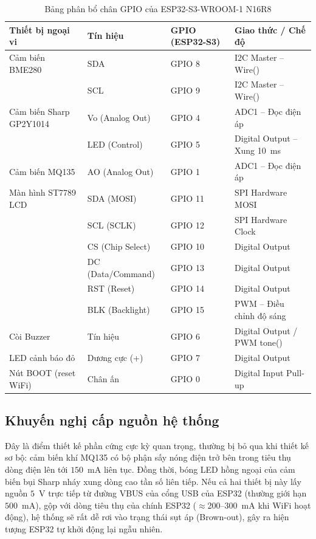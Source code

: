 \documentclass[12pt,a4paper]{article}
\begin{document}
\begin{table}[H]
  \centering
  \caption{Bảng phân bổ chân GPIO của ESP32-S3-WROOM-1 N16R8}
  \label{tab:pinout}
  \small
  \begin{tabular}{p{3.5cm} p{3.5cm} p{3cm} p{4cm}}
    \toprule
    \textbf{Thiết bị ngoại vi} & \textbf{Tín hiệu} & \textbf{GPIO (ESP32-S3)} & \textbf{Giao thức / Chế độ} \\
    \midrule
    Cảm biến BME280 & SDA & GPIO 8 & I2C Master -- Wire() \\
                    & SCL & GPIO 9 & I2C Master -- Wire() \\
    \midrule
    Cảm biến Sharp GP2Y1014 & Vo (Analog Out) & GPIO 4 & ADC1 -- Đọc điện áp \\
                             & LED (Control) & GPIO 5 & Digital Output -- Xung 10~ms \\
    \midrule
    Cảm biến MQ135 & AO (Analog Out) & GPIO 1 & ADC1 -- Đọc điện áp \\
    \midrule
    Màn hình ST7789 LCD & SDA (MOSI) & GPIO 11 & SPI Hardware MOSI \\
                        & SCL (SCLK) & GPIO 12 & SPI Hardware Clock \\
                        & CS (Chip Select) & GPIO 10 & Digital Output \\
                        & DC (Data/Command) & GPIO 13 & Digital Output \\
                        & RST (Reset) & GPIO 14 & Digital Output \\
                        & BLK (Backlight) & GPIO 15 & PWM -- Điều chỉnh độ sáng \\
    \midrule
    Còi Buzzer & Tín hiệu & GPIO 6 & Digital Output / PWM tone() \\
    \midrule
    LED cảnh báo đỏ & Dương cực (+) & GPIO 7 & Digital Output \\
    \midrule
    Nút BOOT (reset WiFi) & Chân ấn & GPIO 0 & Digital Input Pull-up \\
    \bottomrule
  \end{tabular}
\end{table}

\subsection{Khuyến nghị cấp nguồn hệ thống}

Đây là điểm thiết kế phần cứng cực kỳ quan trọng, thường bị bỏ qua khi thiết kế sơ bộ: cảm biến khí MQ135 có bộ phận sấy nóng điện trở bên trong tiêu thụ dòng điện lên tới $150$~mA liên tục. Đồng thời, bóng LED hồng ngoại của cảm biến bụi Sharp nháy xung dòng cao tần số liên tiếp. Nếu cả hai thiết bị này lấy nguồn $5$~V trực tiếp từ đường VBUS của cổng USB của ESP32 (thường giới hạn $500$~mA), gộp với dòng tiêu thụ của chính ESP32 ($\approx$200--300~mA khi WiFi hoạt động), hệ thống sẽ rất dễ rơi vào trạng thái sụt áp (Brown-out), gây ra hiện tượng ESP32 tự khởi động lại ngẫu nhiên.
\end{document}
